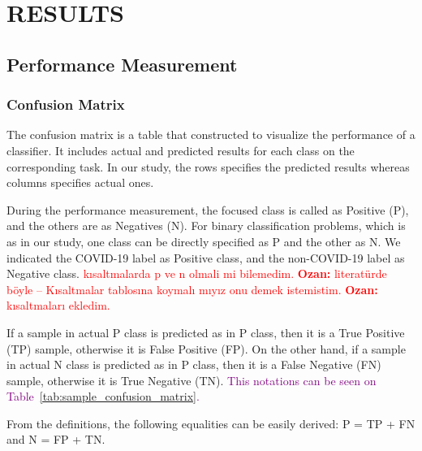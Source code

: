 \chapter{RESULTS}
\label{ch:CH6}

\section{Performance Measurement}

\subsection{Confusion Matrix}

The confusion matrix is a table that constructed to visualize the performance of a classifier. It includes actual and predicted results for each class on the corresponding task. In our study, the rows specifies the predicted results whereas columns specifies actual ones.

During the performance measurement, the focused class is called as Positive (P), and the others are as Negatives (N). For binary classification problems, which is as in our study, one class can be directly specified as P and the other as N. We indicated the COVID-19 label as Positive class, and the non-COVID-19 label as Negative class. \textcolor{red}{kısaltmalarda p ve n olmali mi bilemedim. \textbf{Ozan:} literatürde böyle -- Kısaltmalar tablosına koymalı mıyız onu demek istemistim. \textbf{Ozan:} kısaltmaları ekledim.}

If a sample in actual P class is predicted as in P class, then it is a True Positive (TP) sample, otherwise it is False Positive (FP). On the other hand, if a sample in actual N class is predicted as in P class, then it is a False Negative (FN) sample, otherwise it is True Negative (TN). \textcolor{purple}{This notations can be seen on Table~\ref{tab:sample_confusion_matrix}.}

From the definitions, the following equalities can be easily derived: P = TP + FN and N = FP + TN.

